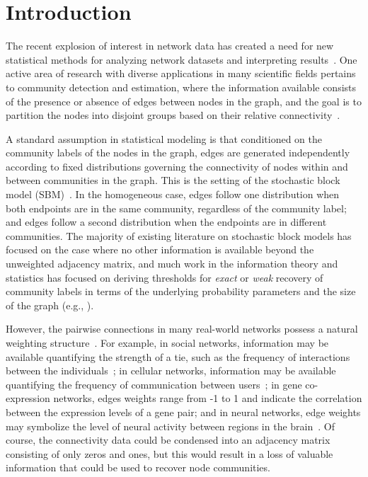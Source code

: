 
\section{Introduction}


The recent explosion of interest in network data has created a need for new statistical methods for analyzing network datasets and interpreting results~\cite{NewEtal06, DavKle10, Jac10, GolEtal10}. One active area of research with diverse applications in many scientific fields pertains to community detection and estimation, where the information available consists of the presence or absence of edges between nodes in the graph, and the goal is to partition the nodes into disjoint groups based on their relative connectivity~\cite{FieEtal85, HarSha00, PriEtal00, ShiMal00, McS01, NewGir04}.

A standard assumption in statistical modeling is that conditioned on the community labels of the nodes in the graph, edges are generated independently according to fixed distributions governing the connectivity of nodes within and between communities in the graph. This is the setting of the stochastic block model (SBM)~\cite{HolEtal83, HarEtal76, WasAnd87}. In the homogeneous case, edges follow one distribution when both endpoints are in the same community, regardless of the community label; and edges follow a second distribution when the endpoints are in different communities. The majority of existing literature on stochastic block models has focused on the case where no other information is available beyond the unweighted adjacency matrix, and much work in the information theory and statistics has focused on  deriving thresholds for \emph{exact} or \emph{weak} recovery of community labels in terms of the underlying probability parameters and the size of the graph (e.g., \cite{MosEtal12, MosEtal14, Mas14, AbbEtal14, abbe2014exact, AbbSan15, HajEtal14, HajEtal15, zhangminimax}).

However, the pairwise connections in many real-world networks possess a natural weighting structure~\cite{New04, BocEtal06}. For example, in social networks, information may be available quantifying the strength of a tie, such as the frequency of interactions between the individuals~\cite{Sad72}; in cellular networks, information may be available quantifying the frequency of communication between users~\cite{BloEtal08}; in gene co-expression networks, edges weights range from -1 to 1 and indicate the correlation between the expression levels of a gene pair; and in neural networks, edge weights may symbolize the level of neural activity between regions in the brain~\cite{RubSpo10}. Of course, the connectivity data could be condensed into an adjacency matrix consisting of only zeros and ones, but this would result in a loss of valuable information that could be used to recover node communities.

